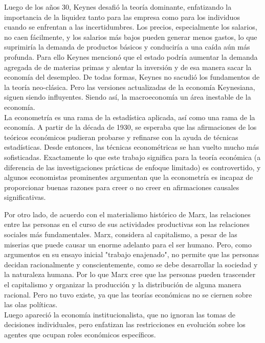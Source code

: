 Luego de los años 30, Keynes desafió la teoría dominante, enfatizando la importancia de la liquidez tanto para las empresa como para los individuos cuando se enfrentan a las incertidumbres. Los precios, especialmente los salarios, no caen fácilmente, y los salarios más bajos pueden generar menos gastos, lo que suprimiría la demanda de productos básicos y conduciría a una caída aún más profunda. Para ello Keynes mencionó que el estado podría aumentar la demanda agregada de de materias primas y alentar la inversión y de esa manera sacar la economía del desempleo. De todas formas, Keynes no sacudió los fundamentos de la teoría neo-clásica. Pero las versiones actualizadas de la economía Keynesiana, siguen siendo influyentes. Siendo así, la macroeconomía un área inestable de la economía.\\

La econometría es una rama de la estadística aplicada, así como una rama de la economía. A partir de la década de 1930, se esperaba que las afirmaciones de los teóricos económicos pudieran probarse y refinarse con la ayuda de técnicas estadísticas. Desde entonces, las técnicas econométricas se han vuelto mucho más sofisticadas. Exactamente lo que este trabajo significa para la teoría económica (a diferencia de las investigaciones prácticas de enfoque limitado) es controvertido, y algunos economistas prominentes argumentan que la econometría es incapaz de proporcionar buenas razones para creer o no creer en afirmaciones causales significativas.

Por otro lado, de acuerdo con el materialismo histórico de Marx, las relaciones entre las personas en el curso de sus actividades productivas son las relaciones sociales más fundamentales. Marx, considera al capitalismo, a pesar de las miserias que puede causar un enorme adelanto para el ser humano. Pero, como argumentos en su ensayo inicial "trabajo enajenado", no permite que las personas decidan racionalmente y conscientemente, como se debe desarrollar la sociedad y la naturaleza humana. Por lo que Marx cree que las personas pueden trascender el capitalismo y organizar la producción y la distribución de alguna manera racional. Pero no tuvo existe, ya que las teorías económicas no se ciernen sobre las olas políticas. \\

Luego apareció la economía institucionalista, que no ignoran las tomas de decisiones individuales, pero enfatizan las restricciones en evolución sobre los agentes que ocupan roles económicos específicos.\\

